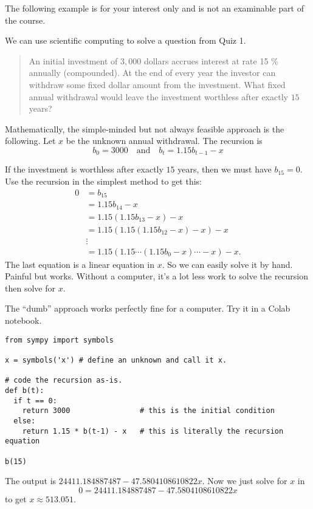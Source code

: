 \documentclass[../main.tex]{subfiles}
\begin{document}
The following example is for your interest only and is not an examinable part of the course. 
\begin{example}
  We can use scientific computing to solve a question from Quiz 1.

  \begin{quote}
    An initial investment of \(3,000\) dollars accrues interest at rate 15 \% annually (compounded). At the end of every year the investor can withdraw some fixed dollar amount from the investment. What fixed annual withdrawal would leave the investment worthless after exactly \(15\) years?
  \end{quote}

  Mathematically, the simple-minded but not always feasible approach is the following.  Let \(x\) be the unknown annual withdrawal. The recursion is
  \[
    b_{0} = 3000 \quad\text{and}\quad b_{t} = 1.15 b_{t-1} - x
  \]

  If the investment is worthless after exactly \(15\) years, then we must have \(b_{15} = 0\). Use the recursion in the simplest method to get this:
  \begin{align*}
    0 & = b_{15} \\
      &= 1.15 b_{14} - x \\
      &= 1.15 (1.15 b_{13} - x) - x \\
      &= 1.15 (1.15 (1.15 b_{12} - x)  - x) - x \\
      &\vdots \\
      &= 1.15 (1.15 \cdots (1.15 b_{0} - x) \cdots - x) - x.
  \end{align*}
  The last equation is a linear equation in \(x\). So we can easily solve it by hand. Painful but works.  Without a computer, it's a lot less work to solve the recursion then solve for \(x\). 

  The ``dumb'' approach works perfectly fine for a computer.  Try it in a Colab notebook.
  \begin{verbatim}
from sympy import symbols

x = symbols('x') # define an unknown and call it x.

# code the recursion as-is.
def b(t):
  if t == 0:
    return 3000                # this is the initial condition
  else:
    return 1.15 * b(t-1) - x   # this is literally the recursion equation 

b(15)
  \end{verbatim}
  The output is \(24411.184887487−47.5804108610822x\). Now we just solve for \(x\) in \[0 = 24411.184887487−47.5804108610822x\]
  to get \(x \approx 513.051\). 
\end{example}
\end{document}
